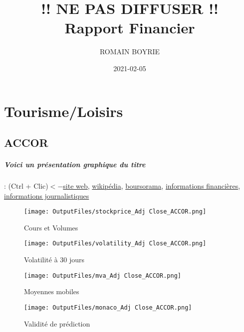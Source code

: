 \documentclass[11pt,a4paper]{report}%
\title{!! NE PAS DIFFUSER !!
\\Rapport Financier}
\author{ROMAIN BOYRIE}
\date{2021-02-05}
\begin{document}
\pagestyle{headings}
\maketitle
\tableofcontents
\chapter{Tourisme/Loisirs}


\section{ACCOR}

\paragraph{Voici un présentation graphique du titre} : (Ctrl + Clic)$<-$\href{https://www.accorinvest.com/fr/}{site web}, \href{https://fr.wikipedia.org/wiki/Accor}{wikipédia}, \href{https://www.boursorama.com/cours/1rPAC}{boursorama}, \href{https://www.qwant.com/?q=site:https:%2f%2fwww.easybourse.com%2faction-societe%2fACCOR&t=web&client=ext-firefox-hp}{informations financières}, \href{https://bourse.lerevenu.com/cours-de-bourse/fiche-valeur-synthese/ACCOR/AC-FR}{informations journalistiques}
\begin{figure}[!htb]
   \begin{minipage}{0.5\textwidth}
     \centering
     \texttt{[image: OutputFiles/stockprice\_Adj Close\_ACCOR.png]}
     \caption{Cours et Volumes}\label{Fig:price_ACCOR}
   \end{minipage}\hfill
   \begin{minipage}{0.5\textwidth}
     \centering
     \texttt{[image: OutputFiles/volatility\_Adj Close\_ACCOR.png]}
     \caption{Volatilité à 30 jours}\label{Fig:volat_ACCOR}
   \end{minipage}
\end{figure}
\begin{figure}[!htb]
   \begin{minipage}{0.5\textwidth}
     \centering
     \texttt{[image: OutputFiles/mva\_Adj Close\_ACCOR.png]}
     \caption{Moyennes mobiles}\label{Fig:mva_ACCOR}
   \end{minipage}\hfill
   \begin{minipage}{0.5\textwidth}
     \centering
     \texttt{[image: OutputFiles/monaco\_Adj Close\_ACCOR.png]}
     \caption{Validité de prédiction}\label{Fig:prediction_ACCOR}
   \end{minipage}
\end{figure}
\end{document}
